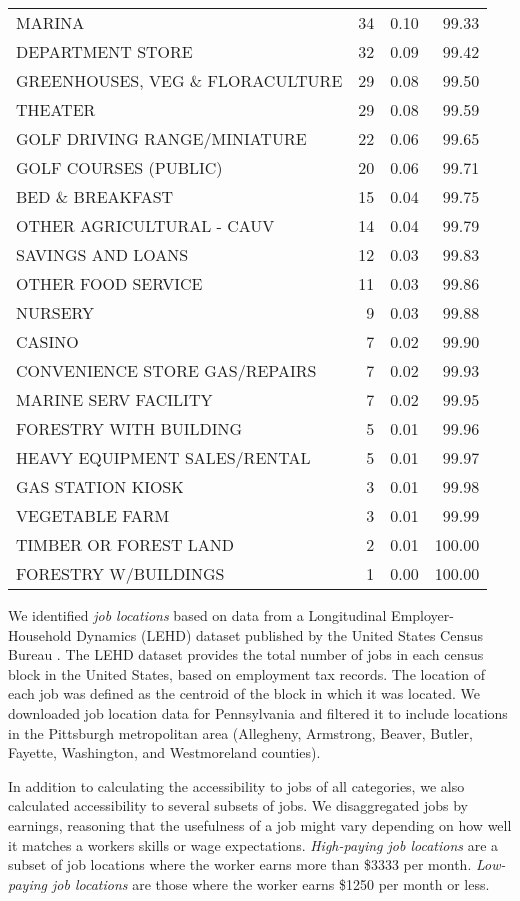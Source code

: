 \documentclass[
]{book}
\theoremstyle{definition}
\theoremstyle{definition}
\theoremstyle{definition}
\theoremstyle{definition}
\theoremstyle{remark}
\begin{document}
\begin{table}
\begin{tabular}[t]{lrrr}
MARINA & 34 & 0.10 & 99.33\\
DEPARTMENT STORE & 32 & 0.09 & 99.42\\
GREENHOUSES, VEG \& FLORACULTURE & 29 & 0.08 & 99.50\\
THEATER & 29 & 0.08 & 99.59\\
\addlinespace
GOLF DRIVING RANGE/MINIATURE & 22 & 0.06 & 99.65\\
GOLF COURSES (PUBLIC) & 20 & 0.06 & 99.71\\
BED \& BREAKFAST & 15 & 0.04 & 99.75\\
OTHER AGRICULTURAL - CAUV & 14 & 0.04 & 99.79\\
SAVINGS AND LOANS & 12 & 0.03 & 99.83\\
\addlinespace
OTHER FOOD SERVICE & 11 & 0.03 & 99.86\\
NURSERY & 9 & 0.03 & 99.88\\
CASINO & 7 & 0.02 & 99.90\\
CONVENIENCE STORE GAS/REPAIRS & 7 & 0.02 & 99.93\\
MARINE SERV FACILITY & 7 & 0.02 & 99.95\\
\addlinespace
FORESTRY WITH BUILDING & 5 & 0.01 & 99.96\\
HEAVY EQUIPMENT SALES/RENTAL & 5 & 0.01 & 99.97\\
GAS STATION KIOSK & 3 & 0.01 & 99.98\\
VEGETABLE FARM & 3 & 0.01 & 99.99\\
TIMBER OR FOREST LAND & 2 & 0.01 & 100.00\\
\addlinespace
FORESTRY W/BUILDINGS & 1 & 0.00 & 100.00\\
\bottomrule
\end{tabular}
\end{table}

We identified \emph{job locations} based on data from a Longitudinal
Employer-Household Dynamics (LEHD) dataset published by the United States Census
Bureau \citep{united_states_census_bureau_lehd_2021}. The LEHD dataset provides the
total number of jobs in each census block in the United States, based on
employment tax records. The location of each job was defined as the centroid of
the block in which it was located. We downloaded job location data for
Pennsylvania and filtered it to include locations in the Pittsburgh metropolitan
area (Allegheny, Armstrong, Beaver, Butler, Fayette, Washington, and
Westmoreland counties).

In addition to calculating the accessibility to jobs of all categories, we also
calculated accessibility to several subsets of jobs. We disaggregated jobs by
earnings, reasoning that the usefulness of a job might vary depending on how
well it matches a workers skills or wage expectations. \emph{High-paying job locations}
are a subset of job locations where the worker earns more than \$3333 per month.
\emph{Low-paying job locations} are those where the worker earns \$1250 per month or less.
\end{document}
